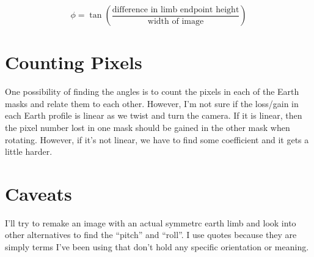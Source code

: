 \documentclass[10pt]{article}
\begin{document}
\begin{equation}
    \phi = \tan{ \left(\frac{ \textrm{difference in limb endpoint height} }{\textrm{width of image}} \right)}
\end{equation}


\section{Counting Pixels} %
\label{sec:counting_pixels}
One possibility of finding the angles is to count the pixels in each of the Earth masks and relate them to each other. However, I'm not sure if the loss/gain in each Earth profile is linear as we twist and turn the camera. If it is linear, then the pixel number lost in one mask should be gained in the other mask when rotating. However, if it's not linear, we have to find some coefficient and it gets a little harder. 


\section{Caveats} %
\label{sec:caveats}
I'll try to remake an image with an actual symmetrc earth limb and look into other alternatives to find the ``pitch'' and ``roll''. I use quotes because they are simply terms I've been using that don't hold any specific orientation or meaning.
\end{document}
